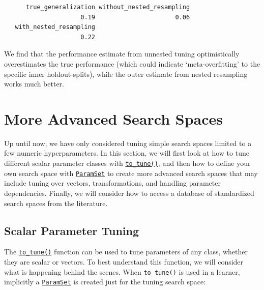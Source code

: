 \begin{verbatim}
      true_generalization without_nested_resampling 
                     0.19                      0.06 
   with_nested_resampling 
                     0.22 
\end{verbatim}

We find that the performance estimate from unnested tuning
optimistically overestimates the true performance (which could indicate
`meta-overfitting' to the specific inner holdout-splits), while the
outer estimate from nested resampling works much better.

\hypertarget{sec-defining-search-spaces}{%
\section{More Advanced Search Spaces}\label{sec-defining-search-spaces}}

Up until now, we have only considered tuning simple search spaces
limited to a few numeric hyperparameters. In this section, we will first
look at how to tune different scalar parameter classes with
\href{https://paradox.mlr-org.com/reference/to_tune.html}{\texttt{to\_tune()}},
and then how to define your own search space with
\href{https://paradox.mlr-org.com/reference/ParamSet.html}{\texttt{ParamSet}}
to create more advanced search spaces that may include tuning over
vectors, transformations, and handling parameter dependencies. Finally,
we will consider how to access a database of standardized search spaces
from the literature.

\hypertarget{scalar-parameter-tuning}{%
\subsection{Scalar Parameter Tuning}\label{scalar-parameter-tuning}}

The
\href{https://paradox.mlr-org.com/reference/to_tune.html}{\texttt{to\_tune()}}
function can be used to tune parameters of any class, whether they are
scalar or vectors. To best understand this function, we will consider
what is happening behind the scenes. When \texttt{to\_tune()} is used in
a learner, implicitly a
\href{https://paradox.mlr-org.com/reference/ParamSet.html}{\texttt{ParamSet}}
is created just for the tuning search space:

\begin{Shaded}
\begin{Highlighting}[]
\OtherTok{=} \NormalTok{(}\NormalTok{,}
   \NormalTok{(}\NormalTok{, }\NormalTok{),}
   \NormalTok{(}\NormalTok{, }\NormalTok{),}
   \NormalTok{,}
   
\NormalTok{)}

\SpecialCharTok{$}\SpecialCharTok{$}\NormalTok{()}
\end{Highlighting}
\end{Shaded}

